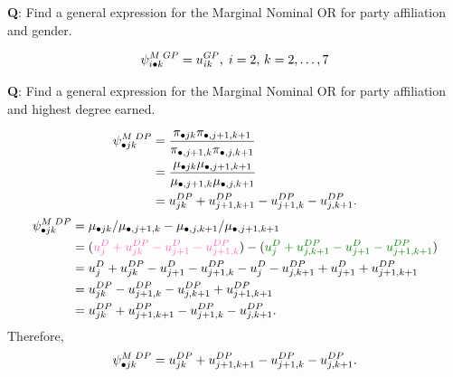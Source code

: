 \documentclass{article}\usepackage[]{graphicx}\usepackage[svgnames]{xcolor}
\let\exp\relax%
\let\log\relax%
\begin{document}
\begin{Example}{}
    \textbf{Q}: Find a general expression for the Marginal Nominal OR for party affiliation and
    gender.
\end{Example}
\[ \psi_{i\bullet k}^{M\; GP}=\exp{u_{ik}^{GP}},\; i=2,\, k=2,\ldots,7 \]
\begin{Example}{}
    \textbf{Q}: Find a general expression for the Marginal Nominal OR for party affiliation and
    highest degree earned.
\end{Example}
\begin{align*}
    \psi_{\bullet jk}^{M\; DP}
     & =\frac{\pi_{\bullet jk}\pi_{\bullet,j+1,k+1}}{\pi_{\bullet,j+1,k}\pi_{\bullet,j,k+1}} \\
     & =\frac{\mu_{\bullet jk}\mu_{\bullet,j+1,k+1}}{\mu_{\bullet,j+1,k}\mu_{\bullet,j,k+1}} \\
     & =\exp{u_{jk}^{DP}+u_{j+1,k+1}^{DP}-u_{j+1,k}^{DP}-u_{j,k+1}^{DP} }.
\end{align*}
\begin{align*}
    \log{\psi_{\bullet jk}^{M\; DP}}
     & =\log{\mu_{\bullet jk}/\mu_{\bullet,j+1,k}}-\log{\mu_{\bullet,j,k+1}/\mu_{\bullet,j+1,k+1}}                                                 \\
     & =(\textcolor{HotPink}{u_j^D+u_{jk}^{DP}-u_{j+1}^{D}-u_{j+1,k}^{DP}})-(\textcolor{Green}{u_j^D+u_{j,k+1}^{DP}-u_{j+1}^{D}-u_{j+1,k+1}^{DP}}) \\
     & =u_j^D+u_{jk}^{DP}-u_{j+1}^{D}-u_{j+1,k}^{DP}-u_j^D-u_{j,k+1}^{DP}+u_{j+1}^{D}+u_{j+1,k+1}^{DP}                                             \\
     & =u_{jk}^{DP}-u_{j+1,k}^{DP}-u_{j,k+1}^{DP}+u_{j+1,k+1}^{DP}                                                                                 \\
     & =u_{jk}^{DP}+u_{j+1,k+1}^{DP}-u_{j+1,k}^{DP}-u_{j,k+1}^{DP}.
\end{align*}
Therefore,
\[ \psi_{\bullet jk}^{M\; DP}=\exp{u_{jk}^{DP}+u_{j+1,k+1}^{DP}-u_{j+1,k}^{DP}-u_{j,k+1}^{DP}}. \]
\end{document}
